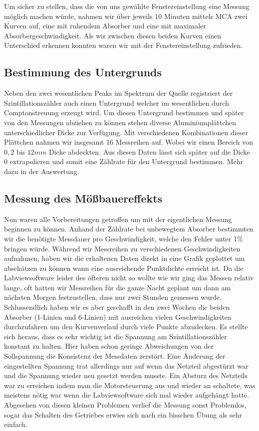 \documentclass[12pt]{article}
\begin{document}
Um sicher zu stellen, dass die von uns gewählte Fenstereinstellung eine Messung möglich machen würde, nahmen wir über jeweils 10 Minuten mittels MCA zwei Kurven auf, eine mit
ruhendem Absorber und eine mit maximaler Absorbergeschwindigkeit. Als wir zwischen diesen beiden Kurven einen Unterschied erkennen konnten waren wir mit der Fenstereinstellung zufrieden.

\subsection{Bestimmung des Untergrunds}
Neben den zwei wesentlichen Peaks im Spektrum der Quelle registriert der Szintillationszähler auch einen Untergrund welcher im wesentlichen durch Comptonstreuung erzeugt wird. Um diesen
Untergrund bestimmen und später von den Messungen abziehen zu können stehen diverse Aluminiumplättchen unterschiedlicher Dicke zur Verfügung. Mit verschiedenen Kombinationen dieser Plättchen nahmen wir
insgesamt 16 Messreihen auf. Wobei wir einen Bereich von $0,2$ bis $12 mm$ Dicke abdeckten. Aus diesen Daten lässt sich später auf die Dicke 0 extrapolieren und somit eine Zählrate für
den Untergrund bestimmen. Mehr dazu in der Auswertung.

\subsection{Messung des Mößbauereffekts}
Nun waren alle Vorbereitungen getroffen um mit der eigentlichen Messung beginnen zu können. Anhand der Zählrate bei unbewegtem Absorber bestimmten wir die benötigte Messdauer pro Geschwindigkeit,
welche den Fehler unter 1\% bringen würde. Während wir Messreihen zu verschiedenen Geschwindigkeiten aufnahmen, haben wir die erhaltenen Daten direkt in eine Grafik geplottet um abschätzen
zu können wann eine ausreichende Punktdichte erreicht ist. Da die Labviewsoftware leider des öfteren nicht so wollte wie wir ging das Messen relativ lange, oft hatten wir Messreihen für die ganze
Nacht geplant um dann am nächsten Morgen festzustellen, dass nur zwei Stunden gemessen wurde. Schlussendlich haben wir es aber geschafft in den zwei Wochen die beiden Absorber (1-Linien und 6-Linien)
mit ausreichen vielen Geschwindigkeiten durchzufahren um den Kurvenverlauf durch viele Punkte abzudecken. Es stellte sich heraus, dass es sehr wichtig ist die Spannung am Szintillationszähler konstant
zu halten. Hier haben schon geringe Abweichungen von der Sollspannung die Konsistenz der Messdaten zerstört. Eine Änderung der eingestellten Spannung trat allerdings nur auf wenn das Netzteil
abgestürzt war und die Spannung wieder neu gesetzt werden musste. Ein Absturz des Netzteils war zu erreichen indem man die Motorsteuerung aus und wieder an schaltete, was meistens nötig war
wenn die Labviewsoftware sich mal wieder aufgehängt hatte. Abgesehen von diesen kleinen Problemen verlief die Messung sonst Problemlos, sogar das Schalten des Getriebes erwies sich nach ein bisschen
Übung als sehr einfach.
\end{document}
